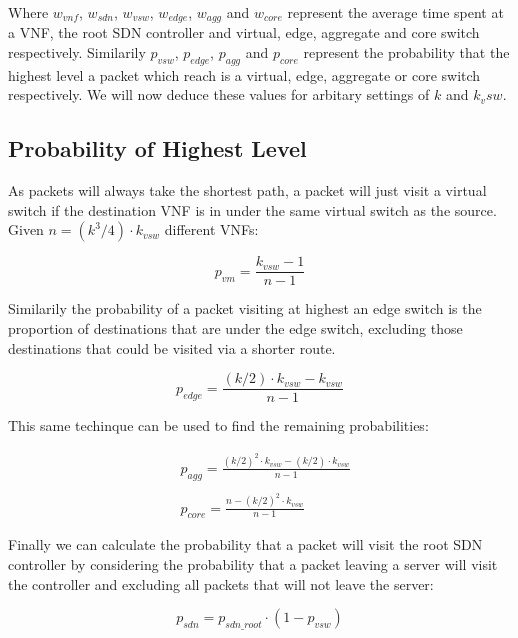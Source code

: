Where $w_{vnf}$, $w_{sdn}$, $w_{vsw}$, $w_{edge}$, $w_{agg}$ and $w_{core}$ represent the average time spent at a VNF, the root SDN controller and virtual, edge, aggregate and core switch respectively. Similarily $p_{vsw}$, $p_{edge}$, $p_{agg}$ and $p_{core}$ represent the probability that the highest level a packet which reach is a virtual, edge, aggregate or core switch respectively. We will now deduce these values for arbitary settings of $k$ and $k_vsw$.

\subsection{Probability of Highest Level}
As packets will always take the shortest path, a packet will just visit a virtual switch if the destination VNF is in under the same virtual switch as the source. Given $n=(k^3/4) \cdot k_{vsw}$ different VNFs:

\begin{equation}
\label{eq:p_vm}
p_{vm} = \frac{k_{vsw} - 1}{n - 1}
\end{equation}

Similarily the probability of a packet visiting at highest an edge switch is the proportion of destinations that are under the edge switch, excluding those destinations that could be visited via a shorter route.

\begin{equation}
\label{eq:p_edge}
p_{edge} = \frac{(k/2) \cdot k_{vsw} - k_{vsw}}{n - 1}
\end{equation}

This same techinque can be used to find the remaining probabilities:

\begin{align}
\label{eq:p_agg_core}
&p_{agg} = \frac{(k/2)^2 \cdot k_{vsw} - (k/2) \cdot k_{vsw}}{n - 1} \\ \nonumber \\
&p_{core} = \frac{n - (k/2)^2 \cdot k_{vsw}}{n - 1}
\end{align}

Finally we can calculate the probability that a packet will visit the root SDN controller by considering the probability that a packet leaving a server will visit the controller and excluding all packets that will not leave the server:

\begin{equation}
\label{eq:p_sdn}
p_{sdn} = p_{sdn\_root} \cdot (1 - p_{vsw})
\end{equation}

